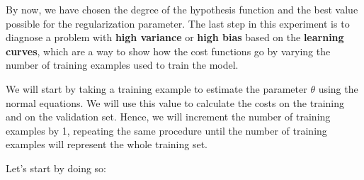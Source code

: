 \documentclass[11pt]{article}
\begin{document}
By now, we have chosen the degree of the hypothesis function and the best value possible for the regularization parameter. The last step in this experiment is to diagnose a problem with \textbf{high variance} or \textbf{high bias} based on the \textbf{learning curves}, which are a way to show how the cost functions go by varying the number of training examples used to train the model.

We will start by taking a training example to estimate the parameter \(\theta\) using the normal equations. We will use this value to calculate the costs on the training and on the validation set. Hence, we will increment the number of training examples by 1, repeating the same procedure until the number of training examples will represent the whole training set.

Let's start by doing so:
\end{document}
